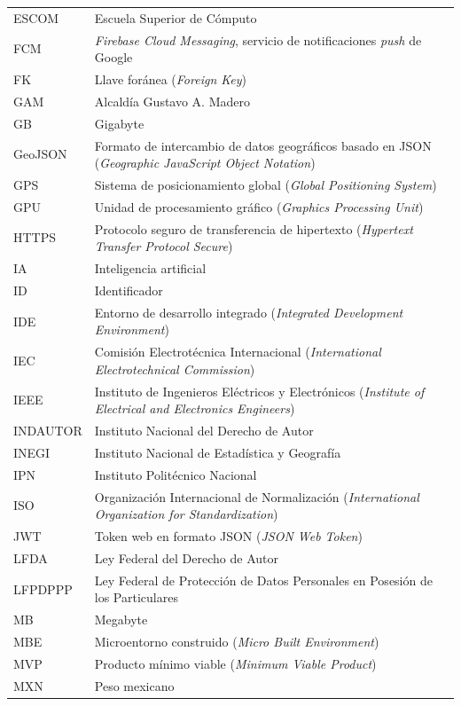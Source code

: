 \begin{longtable}{@{}L{2.4cm}p{\dimexpr\textwidth-2.4cm-2\tabcolsep\relax}@{}}
ESCOM & Escuela Superior de Cómputo \\
FCM & \textit{Firebase Cloud Messaging}, servicio de notificaciones \textit{push} de Google \\
FK & Llave foránea (\textit{Foreign Key}) \\
GAM & Alcaldía Gustavo A. Madero \\
GB & Gigabyte \\
GeoJSON & Formato de intercambio de datos geográficos basado en JSON (\textit{Geographic JavaScript Object Notation}) \\
GPS & Sistema de posicionamiento global (\textit{Global Positioning System}) \\
GPU & Unidad de procesamiento gráfico (\textit{Graphics Processing Unit}) \\
HTTPS & Protocolo seguro de transferencia de hipertexto (\textit{Hypertext Transfer Protocol Secure}) \\
IA & Inteligencia artificial \\
ID & Identificador \\
IDE & Entorno de desarrollo integrado (\textit{Integrated Development Environment}) \\
IEC & Comisión Electrotécnica Internacional (\textit{International Electrotechnical Commission}) \\
IEEE & Instituto de Ingenieros Eléctricos y Electrónicos (\textit{Institute of Electrical and Electronics Engineers}) \\
INDAUTOR & Instituto Nacional del Derecho de Autor \\
INEGI & Instituto Nacional de Estadística y Geografía \\
IPN & Instituto Politécnico Nacional \\
ISO & Organización Internacional de Normalización (\textit{International Organization for Standardization}) \\
JWT & Token web en formato JSON (\textit{JSON Web Token}) \\
LFDA & Ley Federal del Derecho de Autor \\
LFPDPPP & Ley Federal de Protección de Datos Personales en Posesión de los Particulares \\
MB & Megabyte \\
MBE & Microentorno construido (\textit{Micro Built Environment}) \\
MVP & Producto mínimo viable (\textit{Minimum Viable Product}) \\
MXN & Peso mexicano \\

\end{longtable}
